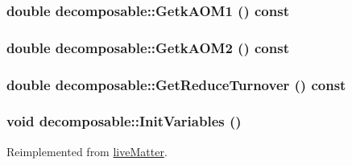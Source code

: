 \label{classdecomposable_a6bfb17228b49bdce4d57a911b1fab099}
\hypertarget{classdecomposable_aef778c85d2d909504863cb25f91c8ffe}{
\subsubsection[{GetkAOM1}]{\setlength{\rightskip}{0pt plus 5cm}double decomposable::GetkAOM1 () const}}
\label{classdecomposable_aef778c85d2d909504863cb25f91c8ffe}
\hypertarget{classdecomposable_abfebaed2dbded430bc75b4d22a54afab}{
\subsubsection[{GetkAOM2}]{\setlength{\rightskip}{0pt plus 5cm}double decomposable::GetkAOM2 () const}}
\label{classdecomposable_abfebaed2dbded430bc75b4d22a54afab}
\hypertarget{classdecomposable_a5df0740211a3624cd45f507fddb7fa3e}{
\subsubsection[{GetReduceTurnover}]{\setlength{\rightskip}{0pt plus 5cm}double decomposable::GetReduceTurnover () const}}
\label{classdecomposable_a5df0740211a3624cd45f507fddb7fa3e}
\hypertarget{classdecomposable_aabfa1610321f138dff27b27e074cf9ea}{
\subsubsection[{InitVariables}]{\setlength{\rightskip}{0pt plus 5cm}void decomposable::InitVariables ()}}
\label{classdecomposable_aabfa1610321f138dff27b27e074cf9ea}


Reimplemented from \hyperlink{classlive_matter_ab14efacc07e048507a6c3dd8d2942101}{liveMatter}.

